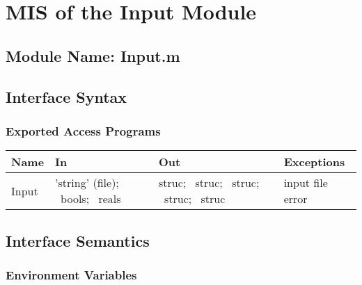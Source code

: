 \documentclass[12pt, titlepage]{article}
\begin{document}

\section{MIS of the Input Module} \label{sec:InputMod}

\subsection{Module Name: Input.m }

\subsection{Interface Syntax}

\subsubsection{Exported Access Programs}
\begin{center}
\renewcommand*{\arraystretch}{1.5}
\begin{tabular}{| p{} | p{} | 
p{} | p{} |} \hline 

  \textbf{Name} & \textbf{In} & \textbf{Out} & \textbf{Exceptions}
  \\ \hline

   Input & 'string' (file); ~\newline bools; ~\newline reals & struc;
   ~\newline struc; ~\newline struc; ~\newline struc; ~\newline struc
   & input file error \\ \hline

\end{tabular}
\end{center}

\subsection{Interface Semantics}

\subsubsection{Environment Variables}
\end{document}
